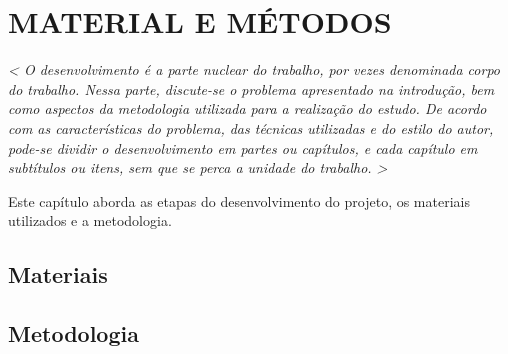 \chapter{MATERIAL E MÉTODOS}\label{cap3MatMet}

\textit{
< O desenvolvimento é a parte nuclear do trabalho, por vezes denominada
corpo do trabalho. Nessa parte, discute-se o problema apresentado
na introdução, bem como aspectos da metodologia utilizada para
a realização do estudo.
De acordo com as características do problema, das técnicas utilizadas
e do estilo do autor, pode-se dividir o desenvolvimento em partes
ou capítulos, e cada capítulo em subtítulos ou itens, sem que se perca a
unidade do trabalho. >
}

\vspace{0.5cm}
Este capítulo aborda as etapas do desenvolvimento do projeto, os materiais utilizados e a metodologia.

\section{Materiais}

\section{Metodologia}

